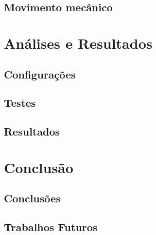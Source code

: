 \documentclass[
	12pt,				%
	openright,			%
	oneside,			%
	a4paper,			%
	english,			%
	brazil				%
	]{abntex2}
\begin{document}
		\section{Movimento mecânico}


	
	\chapter{Análises e Resultados}

		\section{Configurações}

		\section{Testes}

		\section{Resultados}
		

  \chapter{Conclusão}

		\section{Conclusões}

		\section{Trabalhos Futuros}


\postextual



\printindex
\end{document}
